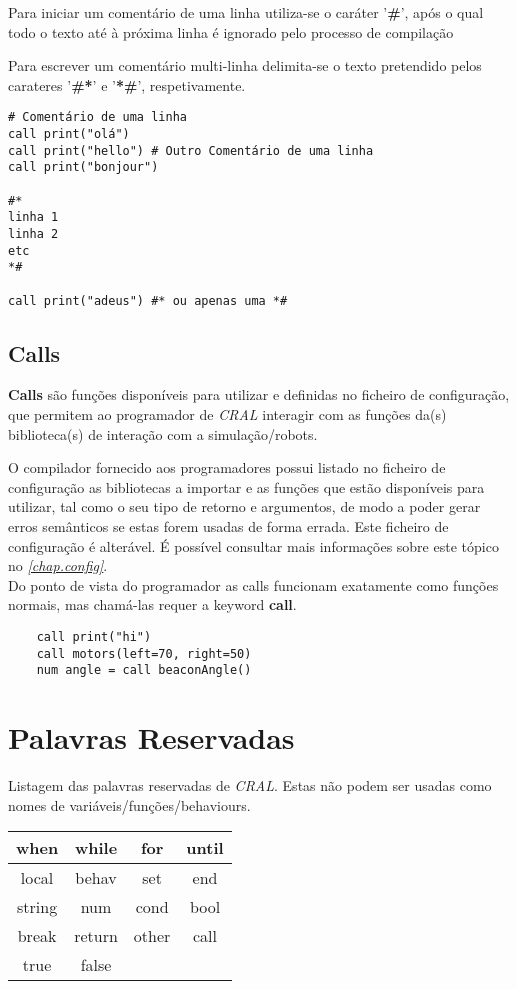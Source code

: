 \documentclass{report}
\begin{document}
Para iniciar um comentário de uma linha utiliza-se o caráter '\textbf{\#}', após o qual todo o texto até à próxima linha é ignorado pelo processo de compilação

Para escrever um comentário multi-linha delimita-se o texto pretendido pelos carateres '\textbf{\#*}' e '\textbf{*\#}', respetivamente.

\begin{verbatim}
# Comentário de uma linha
call print("olá")
call print("hello") # Outro Comentário de uma linha
call print("bonjour")

#* 
linha 1
linha 2
etc
*#

call print("adeus") #* ou apenas uma *#
\end{verbatim}

\subsection{Calls}
\textbf{Calls} são funções disponíveis para utilizar e definidas no ficheiro de configuração, que permitem ao programador de \textit{CRAL} interagir com as funções da(s) biblioteca(s) de interação com a simulação/robots.

O compilador fornecido aos programadores possui listado no ficheiro de configuração as bibliotecas a importar e as funções que estão disponíveis para utilizar, tal como o seu tipo de retorno e argumentos, de modo a poder gerar erros semânticos se estas forem usadas de forma errada. Este ficheiro de configuração é alterável. É possível consultar mais informações sobre este tópico no \textit{\autoref{chap.config}}.\\

Do ponto de vista do programador as calls funcionam exatamente como funções normais, mas chamá-las requer a keyword \textbf{call}.

\begin{verbatim}
    call print("hi")
    call motors(left=70, right=50)
    num angle = call beaconAngle()
\end{verbatim}

\section{Palavras Reservadas}
Listagem das palavras reservadas de \textit{CRAL}. Estas não podem ser usadas como nomes de variáveis/funções/behaviours.
\vspace{5mm}
\begin{center}
\begin{tabular}{| c | c | c | c |}
  \hline
  when & while & for & until\\
  \hline
  local & behav & set & end\\
  \hline
  string & num & cond & bool\\
  \hline
  break & return & other & call\\
  \hline
  true & false & &\\
  \hline
  \end{tabular}
\end{center}
\vspace{3mm}
\end{document}

